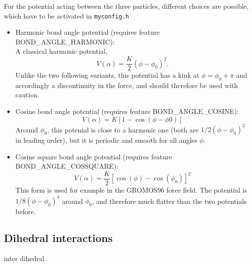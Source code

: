 For the potential acting between the three particles, different choices are
possible, which have to be activated in \texttt{myconfig.h}
\begin{itemize}
\item Harmonic bond angle potential (requires feature BOND_ANGLE_HARMONIC):\\
  A classical harmonic potential,
  \begin{equation}
    V(\alpha) = \frac{K}{2} \left(\phi - \phi_0\right)^2.
  \end{equation}
  Unlike the two following variants, this potential has a kink at
  $\phi=\phi_0+\pi$ and accordingly a discontinuity in the force, and should
  therefore be used with caution.
\item Cosine bond angle potential (requires feature BOND_ANGLE_COSINE):\\
  \begin{equation}
    V(\alpha) = K \left[1 - \cos(\phi - \phi0)\right]
  \end{equation}
  Around $\phi_0$, this potenial is close to a harmonic one (both are
  $1/2(\phi-\phi_0)^2$ in leading order), but it is periodic and smooth for all
  angles $\phi$.
\item Cosine square bond angle potential (requires feature
  BOND_ANGLE_COSSQUARE):\\
  \begin{equation}
    V(\alpha) = \frac{K}{2} \left[\cos(\phi) - \cos(\phi_0)\right]^2
  \end{equation}
  This form is used for example in the GROMOS96 force field. The potential is
  $1/8(\phi-\phi_0)^4$ around $\phi_0$, and therefore much flatter than the
  two potentials before.
\end{itemize}

\subsection{Dihedral interactions}
\label{sec:dihedral}

\begin{essyntax}
  inter 
  dihedral   \var{$\phi$}
\end{essyntax}

